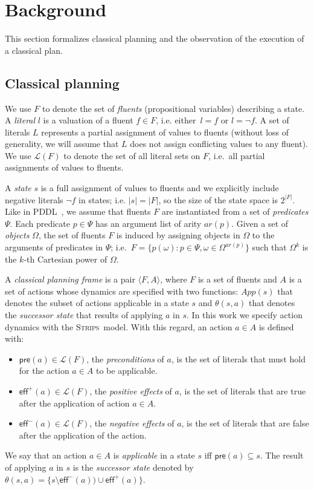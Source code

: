 \documentclass[letterpaper]{article} %
\newcommand{\tup}[1]{{\langle #1 \rangle}}
\newcommand{\pre}{\mathsf{pre}}     %
\newcommand{\eff}{\mathsf{eff}}     %
\newcommand{\strips}{\textsc{Strips}}     %
\begin{document}
\section{Background}
\label{sec:background}
This section formalizes classical planning and the observation of the execution of a classical plan.

\subsection{Classical planning}
We use $F$ to denote the set of {\em fluents} (propositional variables) describing a state. A {\em literal} $l$ is a valuation of a fluent $f\in F$, i.e. either~$l=f$ or $l=\neg f$. A set of literals $L$ represents a partial assignment of values to fluents (without loss of generality, we will assume that $L$ does not assign conflicting values to any fluent). We use $\mathcal{L}(F)$ to denote the set of all literal sets on $F$, i.e.~all partial assignments of values to fluents.

A {\em state} $s$ is a full assignment of values to fluents and we explicitly include negative literals $\neg f$ in states; i.e. $|s|=|F|$, so the size of the state space is $2^{|F|}$. Like in PDDL~\cite{fox2003pddl2}, we assume that fluents $F$ are instantiated from a set of {\em predicates} $\Psi$. Each predicate $p\in\Psi$ has an argument list of arity $ar(p)$. Given a set of {\em objects} $\Omega$, the set of fluents $F$ is induced by assigning objects in $\Omega$ to the arguments of predicates in $\Psi$; i.e.~$F=\{p(\omega):p\in\Psi,\omega\in\Omega^{ar(p)}\}$ such that $\Omega^k$ is the $k$-th Cartesian power of $\Omega$.

A {\em classical planning frame} is a pair $\tup{F,A}$, where $F$ is a set of fluents and $A$ is a set of actions whose dynamics are specified with two functions: $App(s)$ that denotes the subset of actions applicable in a state $s$ and $\theta(s,a)$ that denotes the {\em successor state} that results of applying $a$ in $s$. In this work we specify action dynamics with the \strips\ model. With this regard, an action $a\in A$ is defined with:
\begin{itemize}
\item $\pre(a)\in\mathcal{L}(F)$, the {\em preconditions} of $a$, is the set of literals that must hold for the action $a\in A$ to be applicable.
\item $\eff^+(a)\in\mathcal{L}(F)$, the {\em positive effects} of $a$, is the set of literals that are true after the application of action $a\in A$.
\item $\eff^-(a)\in\mathcal{L}(F)$, the {\em negative effects} of $a$, is the set of literals that are false after the application of the action.
\end{itemize}
We say that an action $a\in A$ is {\em applicable} in a state $s$ iff $\pre(a)\subseteq s$. The result of applying $a$ in $s$ is the {\em successor state} denoted by $\theta(s,a)=\{s\setminus\eff^-(a))\cup\eff^+(a)\}$.
\end{document}
